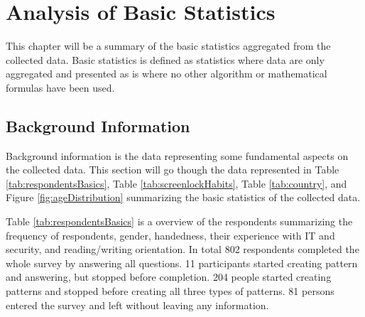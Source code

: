 \section{Analysis of Basic Statistics} \label{sec:basicstatistics}
  
  This chapter will be a summary of the basic statistics aggregated from the collected data. Basic statistics is defined as statistics where data are only aggregated and presented as is where no other algorithm or mathematical formulas have been used.

	\subsection{Background Information} \label{sec:summaryogbasicstats}
    Background information is the data representing some fundamental aspects on the collected data. This section will go though the data represented in Table \ref{tab:respondentsBasics}, Table \ref{tab:screenlockHabits}, Table \ref{tab:country}, and Figure \ref{fig:ageDistribution} summarizing the basic statistics of the collected data. 

    Table \ref{tab:respondentsBasics} is a overview of the respondents summarizing the frequency of respondents, gender, handedness, their experience with IT and security, and reading/writing orientation. In total 802 respondents completed the whole survey by answering all questions. 11 participants started creating pattern and answering, but stopped before completion. 204 people started creating patterns and stopped before creating all three types of patterns. 81 persons entered the survey and left without leaving any information. 

